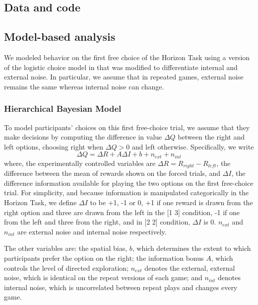 \documentclass[12pt]{article}
\begin{document}
	\subsection*{Data and code}
	
	
	\subsection*{Model-based analysis}
	We modeled behavior on the first free choice of the Horizon Task using a version of the logistic choice model in \citep{wilson2014} that was modified to differentiate internal and external noise. In particular, we assume that in repeated games, external noise remains the same whereas internal noise can change. 
	
	\subsubsection*{Hierarchical Bayesian Model}
	
	To model participants' choices on this first free-choice trial, we assume that they make decisions by computing the difference in value $\Delta Q$ between the right and left options, choosing right when $\Delta Q > 0$ and left otherwise.  Specifically, we write
	\begin{equation}
	\Delta Q= \Delta R+A \Delta    I+b+n_{ext}+n_{int}
	\end{equation}
	where, the experimentally controlled variables are $\Delta R=R_{right}-R_{left}$, the difference between the mean of rewards shown on the forced trials, and $\Delta I$, the difference information available for playing the two options on the first free-choice trial. For simplicity, and because information is manipulated categorically in the Horizon Task, we define $\Delta I$ to be +1, -1 or 0, +1 if one reward is drawn from the right option and three are drawn from the left in the [1 3] condition, -1 if one from the left and three from the right, and in [2 2] condition, $\Delta I$ is 0. $n_{ext}$ and $n_{int}$ are external noise and internal noise respectively. 
	
	The other variables are: the spatial bias, $b$, which determines the extent to which participants prefer the option on the right; the information bonus $A$, which controls the level of directed exploration; $n_{ext}$ denotes the external, external noise, which is identical on the repeat versions of each game; and $n_{int}$ denotes internal noise, which is uncorrelated between repeat plays and changes every game.
	
\end{document}
